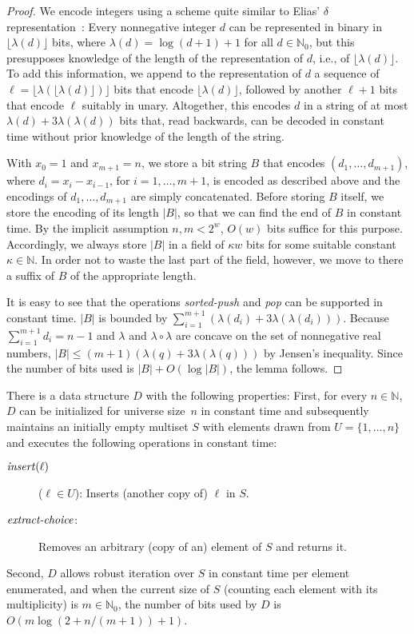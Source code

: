 \documentclass[envcountsame,envcountsect,undated,nolinenumbers]{lnthi}
\def\Tvn#1{\hbox{\textit{#1\/}}}
\def\Tfloor#1{\lfloor #1\rfloor}
\def\TbbbN{\mathbb{N}}
\begin{document}
\begin{proof}
We encode integers using a scheme quite similar
to Elias' $\delta$ representation~\cite{Eli75}:
Every nonnegative integer $d$ can be represented in binary
in $\Tfloor{\lambda(d)}$ bits, where
$\lambda(d)=\log(d+1)+1$ for all $d\in\TbbbN_0$,
but this presupposes knowledge of the length of
the representation of $d$, i.e., of $\Tfloor{\lambda(d)}$.
To add this information, we append to the
representation of $d$ a sequence of
$\ell=\Tfloor{\lambda(\Tfloor{\lambda(d)})}$
bits that encode $\Tfloor{\lambda(d)}$, followed by another
$\ell+1$ bits that encode $\ell$ suitably in unary.
Altogether, this encodes $d$ in a string of
at most $\lambda(d)+3\lambda(\lambda(d))$ bits that,
read backwards, can be decoded in constant time without prior
knowledge of the length of the string.

With $x_0=1$ and $x_{m+1}=n$,
we store a bit string $B$ that encodes
$(d_1,\ldots,d_{m+1})$, where
$d_i=x_i-x_{i-1}$, for $i=1,\ldots,m+1$,
is encoded as described above
and the encodings of $d_1,\ldots,d_{m+1}$
are simply concatenated.
Before storing $B$ itself, we store the
encoding of its length
$|B|$, so that we can find the end of $B$ in
constant time.
By the implicit assumption $n,m<2^w$,
$O(w)$ bits suffice for this purpose.
Accordingly, we always store $|B|$ in a field of $\kappa w$ bits
for some suitable constant $\kappa\in\TbbbN$.
In order not to waste the last part of the field,
however, we move to there a suffix of $B$ of
the appropriate length.

It is easy to see that the operations
\Tvn{sorted-push} and \Tvn{pop} can
be supported in constant time.
$|B|$ is bounded by
$\sum_{i=1}^{m+1}(\lambda(d_i)+3\lambda(\lambda(d_i)))$.
Because $\sum_{i=1}^{m+1}d_i=n-1$ and
$\lambda$ and $\lambda\circ\lambda$ are concave
on the set of nonnegative real numbers,
$|B|\le(m+1)(\lambda(q)+3\lambda(\lambda(q)))$
by Jensen's inequality.
Since the number of bits used is
$|B|+O(\log|B|)$, the lemma follows.
\end{proof}

\begin{theorem}
\label{thm:mlog}There is a data structure $D$ with the following
properties:
First, for every $n\in\TbbbN$, $D$ can
be initialized for universe size~$n$
in constant time and subsequently maintains
an initially empty multiset $S$ with elements drawn from
$U=\{1,\ldots,n\}$ and executes the following
operations in constant time:

\begin{description}
\item[\normalfont$\Tvn{insert}(\ell)$]
($\ell\in U$): Inserts (another copy of) $\ell$ in $S$.
\item[\normalfont$\Tvn{extract-choice}$:]
Removes an arbitrary (copy of an) element of $S$
and returns it.
\end{description}

\noindent
Second, $D$ allows robust iteration over $S$
in constant time per element enumerated,
and when the current size of $S$
(counting each element with its multiplicity) is $m\in\TbbbN_0$,
the number of bits used by $D$ is
$O(m\log(2+{n/{(m+1)}})+1)$.
\end{theorem}
\end{document}
